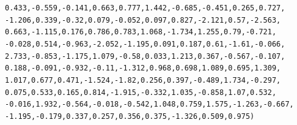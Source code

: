 \documentclass{report}\usepackage[]{graphicx}\usepackage[]{color}
\makeatletter
\newcommand{\hlnum}[1]{\textcolor[rgb]{0.686,0.059,0.569}{#1}}%
\newcommand{\hlopt}[1]{\textcolor[rgb]{0,0,0}{#1}}%
\newcommand{\hlstd}[1]{\textcolor[rgb]{0.345,0.345,0.345}{#1}}%
\newenvironment{kframe}{%
 \def\at@end@of@kframe{}%
 \ifinner\ifhmode%
  \def\at@end@of@kframe{\end{minipage}}%
  \begin{minipage}{\columnwidth}%
 \fi\fi%
 \def\FrameCommand##1{\hskip\@totalleftmargin \hskip-\fboxsep
 \colorbox{shadecolor}{##1}\hskip-\fboxsep
     \hskip-\linewidth \hskip-\@totalleftmargin \hskip\columnwidth}%
 \MakeFramed {\advance\hsize-\width
   \@totalleftmargin\z@ \linewidth\hsize
   \@setminipage}}%
 {\par\unskip\endMakeFramed%
 \at@end@of@kframe}
\newenvironment{knitrout}{}{} %
\makeatother
\begin{document}
\begin{knitrout}
\begin{kframe}
\begin{alltt}
    \hlnum{0.433}\hlstd{,} \hlopt{-}\hlnum{0.559}\hlstd{,} \hlopt{-}\hlnum{0.141}\hlstd{,} \hlnum{0.663}\hlstd{,} \hlnum{0.777}\hlstd{,} \hlnum{1.442}\hlstd{,} \hlopt{-}\hlnum{0.685}\hlstd{,} \hlopt{-}\hlnum{0.451}\hlstd{,} \hlnum{0.265}\hlstd{,} \hlnum{0.727}\hlstd{,}
    \hlopt{-}\hlnum{1.206}\hlstd{,} \hlnum{0.339}\hlstd{,} \hlopt{-}\hlnum{0.32}\hlstd{,} \hlnum{0.079}\hlstd{,} \hlopt{-}\hlnum{0.052}\hlstd{,} \hlnum{0.097}\hlstd{,} \hlnum{0.827}\hlstd{,} \hlopt{-}\hlnum{2.121}\hlstd{,} \hlnum{0.57}\hlstd{,} \hlopt{-}\hlnum{2.563}\hlstd{,}
    \hlnum{0.663}\hlstd{,} \hlopt{-}\hlnum{1.115}\hlstd{,} \hlnum{0.176}\hlstd{,} \hlnum{0.786}\hlstd{,} \hlnum{0.783}\hlstd{,} \hlnum{1.068}\hlstd{,} \hlopt{-}\hlnum{1.734}\hlstd{,} \hlnum{1.255}\hlstd{,} \hlnum{0.79}\hlstd{,} \hlopt{-}\hlnum{0.721}\hlstd{,}
    \hlopt{-}\hlnum{0.028}\hlstd{,} \hlnum{0.514}\hlstd{,} \hlopt{-}\hlnum{0.963}\hlstd{,} \hlopt{-}\hlnum{2.052}\hlstd{,} \hlopt{-}\hlnum{1.195}\hlstd{,} \hlnum{0.091}\hlstd{,} \hlnum{0.187}\hlstd{,} \hlnum{0.61}\hlstd{,} \hlopt{-}\hlnum{1.61}\hlstd{,} \hlopt{-}\hlnum{0.066}\hlstd{,}
    \hlnum{2.733}\hlstd{,} \hlopt{-}\hlnum{0.853}\hlstd{,} \hlopt{-}\hlnum{1.175}\hlstd{,} \hlnum{1.079}\hlstd{,} \hlopt{-}\hlnum{0.58}\hlstd{,} \hlnum{0.033}\hlstd{,} \hlnum{1.213}\hlstd{,} \hlnum{0.367}\hlstd{,} \hlopt{-}\hlnum{0.567}\hlstd{,} \hlopt{-}\hlnum{0.107}\hlstd{,}
    \hlnum{0.188}\hlstd{,} \hlopt{-}\hlnum{0.091}\hlstd{,} \hlopt{-}\hlnum{0.932}\hlstd{,} \hlopt{-}\hlnum{0.11}\hlstd{,} \hlopt{-}\hlnum{1.312}\hlstd{,} \hlnum{0.968}\hlstd{,} \hlnum{0.698}\hlstd{,} \hlnum{1.089}\hlstd{,} \hlnum{0.695}\hlstd{,} \hlnum{1.309}\hlstd{,}
    \hlnum{1.017}\hlstd{,} \hlnum{0.677}\hlstd{,} \hlnum{0.471}\hlstd{,} \hlopt{-}\hlnum{1.524}\hlstd{,} \hlopt{-}\hlnum{1.82}\hlstd{,} \hlnum{0.256}\hlstd{,} \hlnum{0.397}\hlstd{,} \hlopt{-}\hlnum{0.489}\hlstd{,} \hlnum{1.734}\hlstd{,} \hlopt{-}\hlnum{0.297}\hlstd{,}
    \hlnum{0.075}\hlstd{,} \hlnum{0.533}\hlstd{,} \hlnum{0.165}\hlstd{,} \hlnum{0.814}\hlstd{,} \hlopt{-}\hlnum{1.915}\hlstd{,} \hlopt{-}\hlnum{0.332}\hlstd{,} \hlnum{1.035}\hlstd{,} \hlopt{-}\hlnum{0.858}\hlstd{,} \hlnum{1.07}\hlstd{,} \hlnum{0.532}\hlstd{,}
    \hlopt{-}\hlnum{0.016}\hlstd{,} \hlnum{1.932}\hlstd{,} \hlopt{-}\hlnum{0.564}\hlstd{,} \hlopt{-}\hlnum{0.018}\hlstd{,} \hlopt{-}\hlnum{0.542}\hlstd{,} \hlnum{1.048}\hlstd{,} \hlnum{0.759}\hlstd{,} \hlnum{1.575}\hlstd{,} \hlopt{-}\hlnum{1.263}\hlstd{,} \hlopt{-}\hlnum{0.667}\hlstd{,}
    \hlopt{-}\hlnum{1.195}\hlstd{,} \hlopt{-}\hlnum{0.179}\hlstd{,} \hlnum{0.337}\hlstd{,} \hlnum{0.257}\hlstd{,} \hlnum{0.356}\hlstd{,} \hlnum{0.375}\hlstd{,} \hlopt{-}\hlnum{1.326}\hlstd{,} \hlnum{0.509}\hlstd{,} \hlnum{0.975}\hlstd{)}


\end{alltt}
\end{kframe}
\end{knitrout}
\end{document}
